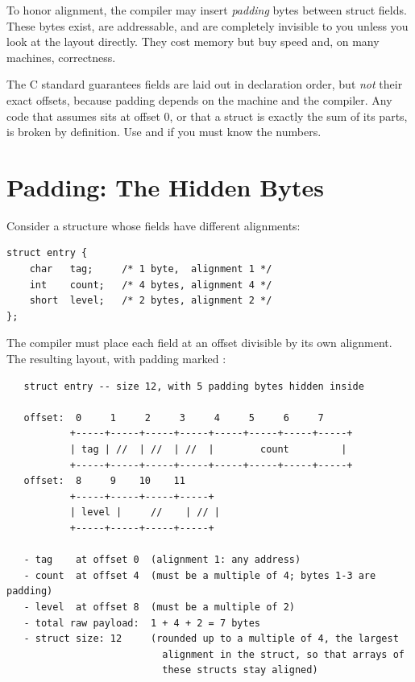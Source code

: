 To honor alignment, the compiler may insert \emph{padding} bytes
between struct fields. These bytes exist, are addressable, and are
completely invisible to you unless you look at the layout directly.
They cost memory but buy speed and, on many machines, correctness.

\begin{ruleofthumb}
The C standard guarantees fields are laid out in declaration order, but
\emph{not} their exact offsets, because padding depends on the machine
and the compiler. Any code that assumes  sits at offset 0, or
that a struct is exactly the sum of its parts, is broken by definition.
Use  and  if you must know the numbers.
\end{ruleofthumb}

\section{Padding: The Hidden Bytes}

Consider a structure whose fields have different alignments:

\begin{lstlisting}[caption={A struct with mixed field sizes.}]
struct entry {
    char   tag;     /* 1 byte,  alignment 1 */
    int    count;   /* 4 bytes, alignment 4 */
    short  level;   /* 2 bytes, alignment 2 */
};
\end{lstlisting}

The compiler must place each field at an offset divisible by its own
alignment. The resulting layout, with padding marked \code{//}:

\begin{verbatim}
   struct entry -- size 12, with 5 padding bytes hidden inside

   offset:  0     1     2     3     4     5     6     7
           +-----+-----+-----+-----+-----+-----+-----+-----+
           | tag | //  | //  | //  |        count         |
           +-----+-----+-----+-----+-----+-----+-----+-----+
   offset:  8     9    10    11
           +-----+-----+-----+-----+
           | level |     //    | // |
           +-----+-----+-----+-----+

   - tag    at offset 0  (alignment 1: any address)
   - count  at offset 4  (must be a multiple of 4; bytes 1-3 are padding)
   - level  at offset 8  (must be a multiple of 2)
   - total raw payload:  1 + 4 + 2 = 7 bytes
   - struct size: 12     (rounded up to a multiple of 4, the largest
                           alignment in the struct, so that arrays of
                           these structs stay aligned)
\end{verbatim}


